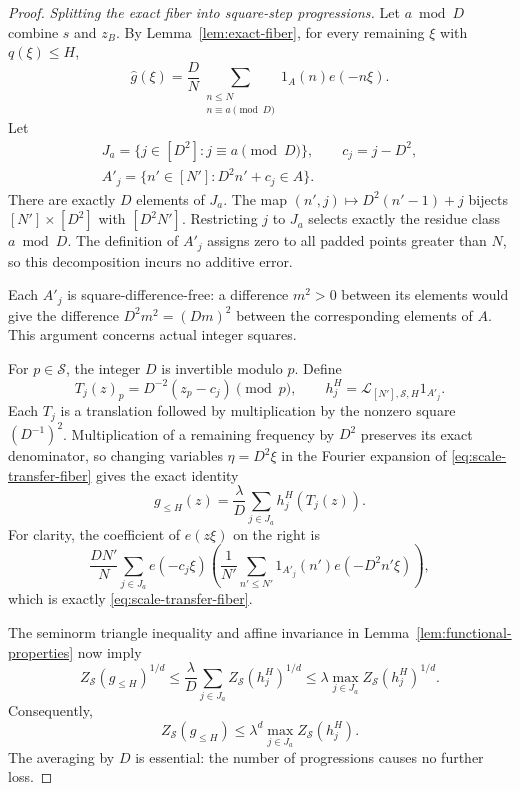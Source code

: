 \begin{proof}
\smallskip
\noindent\emph{Splitting the exact fiber into square-step progressions.}
Let \(a\bmod D\) combine \(s\) and \(z_B\).  By
Lemma~\ref{lem:exact-fiber}, for every remaining \(\xi\) with
\(q(\xi)\le H\),
\begin{equation}
 \widehat g(\xi)=\frac D N
   \sum_{\substack{n\le N\\n\equiv a\pmod D}}1_A(n)e(-n\xi).
 \label{eq:scale-transfer-fiber}
\end{equation}
Let
\[
 \begin{gathered}
 J_a=\{j\in[D^2]:j\equiv a\pmod D\},\qquad
 c_j=j-D^2,\\
 A'_j=\{n'\in[N']:D^2n'+c_j\in A\}.
 \end{gathered}
\]
There are exactly \(D\) elements of \(J_a\).
The map \((n',j)\mapsto D^2(n'-1)+j\) bijects
\([N']\times[D^2]\) with \([D^2N']\).
Restricting \(j\) to \(J_a\) selects exactly the residue class
\(a\bmod D\).  The definition of \(A'_j\) assigns zero to all padded
points greater than \(N\), so this decomposition incurs no additive
error.

Each \(A'_j\) is square-difference-free: a difference \(m^2>0\)
between its elements would give the difference
\(D^2m^2=(Dm)^2\) between the corresponding elements of \(A\).
This argument concerns actual integer squares.

For \(p\in\mathcal S\), the integer \(D\) is invertible modulo \(p\).
Define
\[
 T_j(z)_p=D^{-2}(z_p-c_j)\pmod p,\qquad
 h_j^H=\mathcal L_{[N'],\mathcal S,H}1_{A'_j}.
\]
Each \(T_j\) is a translation followed by multiplication by the
nonzero square \((D^{-1})^2\).
Multiplication of a remaining frequency by \(D^2\) preserves its
exact denominator, so changing variables \(\eta=D^2\xi\) in the
Fourier expansion of \eqref{eq:scale-transfer-fiber} gives the exact
identity
\begin{equation}
 g_{\le H}(z)
 =\frac{\lambda}{D}\sum_{j\in J_a}h_j^H(T_j(z)).
 \label{eq:scale-transfer-affine-average}
\end{equation}
For clarity, the coefficient of \(e(z\xi)\) on the right is
\[
 \frac{DN'}N\sum_{j\in J_a}e(-c_j\xi)
 \left(\frac1{N'}\sum_{n'\le N'}
       1_{A'_j}(n')e(-D^2n'\xi)\right),
\]
which is exactly \eqref{eq:scale-transfer-fiber}.

The seminorm triangle inequality and affine invariance in
Lemma~\ref{lem:functional-properties} now imply
\[
 Z_{\mathcal S}(g_{\le H})^{1/d}
 \le \frac{\lambda}{D}
        \sum_{j\in J_a}Z_{\mathcal S}(h_j^H)^{1/d}
 \le \lambda\max_{j\in J_a}Z_{\mathcal S}(h_j^H)^{1/d}.
\]
Consequently,
\begin{equation}
 Z_{\mathcal S}(g_{\le H})
 \le\lambda^d\max_{j\in J_a}Z_{\mathcal S}(h_j^H).
 \label{eq:scale-transfer-progressions}
\end{equation}
The averaging by \(D\) is essential: the number of progressions
causes no further loss.


\end{proof}
